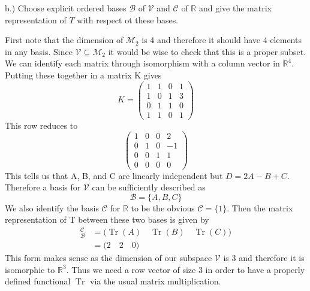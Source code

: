 \documentclass[a4paper, 11pt]{article}
\newcommand{\R}{\mathbb{R}}
\newenvironment{solution}{%
	\begin{list}{}{%
			\setlength{\topsep}{0pt}%
			\setlength{\leftmargin}{1.5cm}%
			\setlength{\rightmargin}{1.5cm}%
			\setlength{\listparindent}{\parindent}%
			\setlength{\itemindent}{\parindent}%
			\setlength{\parsep}{\parskip}%
		}%
		\item[]}{\end{list}}
\begin{document}
\noindent b.) Choose explicit ordered bases $\mathcal{B}$ of $\mathcal{V}$ and $\mathcal{C}$ of $\R$ and give the matrix representation of $T$ with respect ot these bases.\\
	\begin{solution}
		\noindent First note that the dimension of $\mathcal{M}_2$ is 4 and therefore it should have 4 elements in any basis. Since $\mathcal{V}\subseteq\mathcal{M}_2$ it would be wise to check that this is a proper subset. We can identify each matrix through isomorphism with a column vector in $\R^4$. Putting these together in a matrix K gives 
			\begin{equation*}
				K = \begin{pmatrix}
					1 & 1 & 0 & 1 \\ 
					1 & 0 & 1 & 3 \\ 
					0 & 1 & 1 & 0 \\ 
					1 & 1 & 0 & 1 
				\end{pmatrix}
			\end{equation*}
		This row reduces to 
			\begin{equation*}
				\begin{pmatrix}
					1 & 0 & 0 & 2 \\ 
					0 & 1 & 0 & -1 \\ 
					0 & 0 & 1 & 1 \\ 
					0 & 0 & 0 & 0
				\end{pmatrix}
			\end{equation*}
		This tells us that A, B, and C are linearly independent but $D=2A-B+C$. Therefore a basis for $\mathcal{V}$ can be sufficiently described as 
			\begin{equation*}
				\mathcal{B} = \{A, B, C\}
			\end{equation*}
		We also identify the basis $\mathcal{C}$ for $\R$ to be the obvious $\mathcal{C}=\{1\}$. Then the matrix representation of T between these two bases is given by 
			\begin{align*}
				[T]_\mathcal{B}^\mathcal{C} &= \Big(\operatorname{Tr}(A)\quad \operatorname{Tr}(B)\quad \operatorname{Tr}(C)\Big)\\
					&= \Big( 2 \quad 2 \quad 0 \Big)
			\end{align*}
		This form makes sense as the dimension of our subspace $\mathcal{V}$ is 3 and therefore it is isomorphic to $\R^3$. Thus we need a row vector of size 3 in order to have a properly defined functional $\operatorname{Tr}$ via the usual matrix multiplication. \\
	\end{solution}
\end{document}

